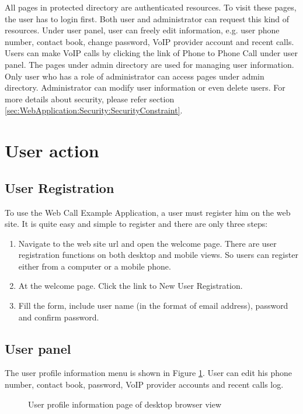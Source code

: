 All pages in protected directory are authenticated resources. To visit these pages, the user has to login first. Both user and administrator can request this kind of resources. Under user panel, user can freely edit information, e.g. user phone number, contact book, change password, VoIP provider account and recent calls. Users can make VoIP calls by clicking the link of Phone to Phone Call under user panel. 
The pages under admin directory are used for managing user information. Only user who has a role of administrator can access pages under admin directory. Administrator can modify user information or even delete users. 
For more details about security, please refer section \ref{sec:WebApplication:Security:SecurityConstraint}.

\section{User action}
\label{sec:WebApplication:UserAction}

\subsection{User Registration}

To use the Web Call Example Application, a user must register him on the web site. It is quite easy and simple to register and there are only three steps: 
\begin{enumerate}
\item Navigate to the web site url and open the welcome page. There are user registration functions on both desktop and mobile views. So users can register either from a computer or a mobile phone.
\item At the welcome page. Click the link to New User Registration.
\item Fill the form, include user name (in the format of email address), password and confirm password.
\end{enumerate}

\subsection{User panel}

The user profile information menu is shown in Figure \ref{fig:UserProfileInformationDesktopView}. User can edit his phone number, contact book, password, VoIP provider accounts and recent calls log.

\begin{figure}[!hbtp]
\centering
{}
\caption{User profile information page of desktop browser view}
\label{fig:UserProfileInformationDesktopView}
\end{figure} 

